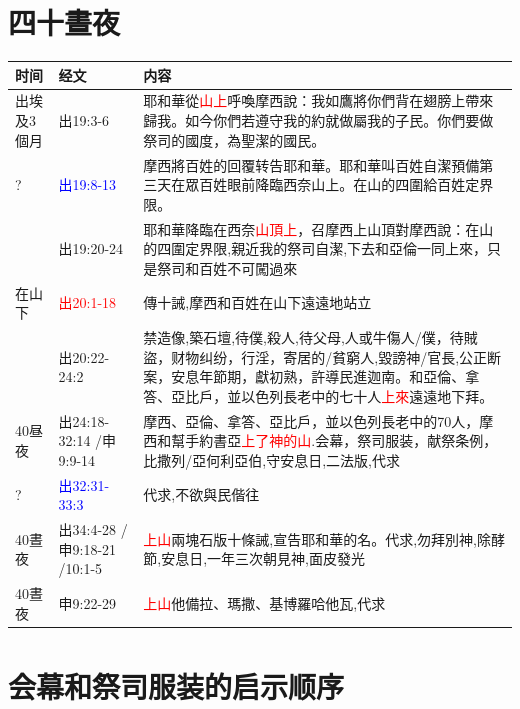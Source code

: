 \section{四十晝夜}
\begin{table}[H]
\centering 
\begin{tabular}{p{1.25cm}|p{2.5cm}|p{12.5cm}}\hline\hline
时间&经文&内容\\\hline
出埃及3個月
&出19:3-6
&耶和華從\textcolor{red}{山上}呼喚摩西說：我如鷹將你們背在翅膀上帶來歸我。如今你們若遵守我的約就做屬我的子民。你們要做祭司的國度，為聖潔的國民。\\\hline

?&\textcolor{blue}{出19:8-13}
&摩西將百姓的回覆转告耶和華。耶和華叫百姓自潔預備第三天在眾百姓眼前降臨西奈山上。在山的四圍給百姓定界限。\\\hline

&出19:20-24
&耶和華降臨在西奈\textcolor{red}{山頂上}，召摩西上山頂對摩西說：在山的四圍定界限,親近我的祭司自潔,下去和亞倫一同上來，只是祭司和百姓不可闖過來\\\hline

在山下&\textcolor{red}{出20:1-18}
&傳十誡,摩西和百姓在山下遠遠地站立\\\hline

&出20:22-24:2
&禁造像,築石壇,待僕,殺人,待父母,人或牛傷人/僕，待賊盜，财物纠纷，行淫，寄居的/貧窮人,毀謗神/官長,公正断案，安息年節期，獻初熟，許導民進迦南。和亞倫、拿答、亞比戶，並以色列長老中的七十人\textcolor{red}{上來}遠遠地下拜。\\\hline

40昼夜&出24:18-32:14 /申9:9-14&摩西、亞倫、拿答、亞比戶，並以色列長老中的70人，摩西和幫手約書亞\textcolor{red}{上了神的山}.会幕，祭司服装，献祭条例，比撒列/亞何利亞伯,守安息日,二法版,代求\\\hline

?&\textcolor{blue}{出32:31-33:3}&代求,不欲與民偕往\\\hline

40晝夜&出34:4-28 /申9:18-21 /10:1-5&\textcolor{red}{上山}兩塊石版十條誡,宣告耶和華的名。代求,勿拜別神,除酵節,安息日,一年三次朝見神,面皮發光\\\hline

40晝夜&申9:22-29&\textcolor{red}{上山}他備拉、瑪撒、基博羅哈他瓦,代求\\\hline
\end{tabular}
\end{table}


\section{会幕和祭司服装的启示顺序}


